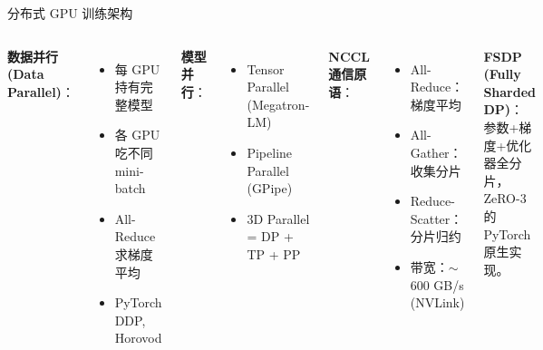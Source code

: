 \documentclass[11pt, aspectratio=169, svgnames, table, fontset=fandol]{ctexbeamer}
\begin{document}
\begin{frame}{分布式 GPU 训练架构}
  \begin{columns}[T]
    \textbf{数据并行 (Data Parallel)}：
    \begin{itemize}
      \item 每 GPU 持有完整模型
      \item 各 GPU 吃不同 mini-batch
      \item All-Reduce 求梯度平均
      \item PyTorch DDP, Horovod
    \end{itemize}

    \vspace{4pt}
    \textbf{模型并行}：
    \begin{itemize}
      \item Tensor Parallel (Megatron-LM)
      \item Pipeline Parallel (GPipe)
      \item 3D Parallel = DP + TP + PP
    \end{itemize}
    \textbf{NCCL 通信原语}：
    \begin{itemize}
      \item All-Reduce：梯度平均
      \item All-Gather：收集分片
      \item Reduce-Scatter：分片归约
      \item 带宽：$\sim$600 GB/s (NVLink)
    \end{itemize}

    \vspace{4pt}
    \textbf{FSDP (Fully Sharded DP)}：\\
    参数+梯度+优化器全分片，ZeRO-3 的 PyTorch 原生实现。
  \end{columns}
\end{frame}
\end{document}
